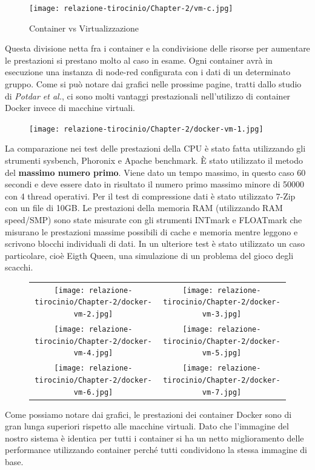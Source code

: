 \documentclass[a4paper,10pt]{memoir}
\begin{document}
\begin{figure}[ht]
\caption{Container vs Virtualizzazione}
\texttt{[image: relazione-tirocinio/Chapter-2/vm-c.jpg]}
\end{figure}
Questa divisione netta fra i container e la condivisione delle risorse per aumentare le prestazioni si prestano molto al caso in esame. Ogni container avrà in esecuzione una instanza di node-red configurata con i dati di un determinato gruppo.
Come si può notare dai grafici nelle prossime pagine, tratti dallo studio di \textit{Potdar et al.}\cite{dockervsvm}, ci sono molti vantaggi prestazionali nell'utilizzo di container Docker invece di macchine virtuali.

\begin{figure}
    \texttt{[image: relazione-tirocinio/Chapter-2/docker-vm-1.jpg]}
    \label{fig:docker-vm-1}
\end{figure}
La comparazione nei test delle prestazioni della CPU è stato fatta utilizzando gli strumenti sysbench, Phoronix e Apache benchmark. È stato utilizzato il metodo del \textbf{massimo numero primo}.
Viene dato un tempo massimo, in questo caso 60 secondi e deve essere dato in risultato il numero primo massimo minore di 50000 con 4 thread operativi.
Per il test di compressione dati è stato utilizzato 7-Zip con un file di 10GB.
Le prestazioni della memoria RAM (utilizzando RAM speed/SMP) sono state misurate con gli strumenti INTmark e FLOATmark che misurano le prestazioni massime possibili di cache e memoria mentre leggono e scrivono blocchi individuali di dati.
In un ulteriore test è stato utilizzato un caso particolare, cioè Eigth Queen, una simulazione di un problema del gioco degli scacchi.
\begin{figure}
\begin{tabular}{cc}
  \texttt{[image: relazione-tirocinio/Chapter-2/docker-vm-2.jpg]} &   \texttt{[image: relazione-tirocinio/Chapter-2/docker-vm-3.jpg]} \\
 \texttt{[image: relazione-tirocinio/Chapter-2/docker-vm-4.jpg]} &   \texttt{[image: relazione-tirocinio/Chapter-2/docker-vm-5.jpg]} \\
 \texttt{[image: relazione-tirocinio/Chapter-2/docker-vm-6.jpg]} &   \texttt{[image: relazione-tirocinio/Chapter-2/docker-vm-7.jpg]} \\
\end{tabular}
\end{figure}
Come possiamo notare dai grafici, le prestazioni dei container Docker sono di gran lunga superiori rispetto alle macchine virtuali. Dato che l'immagine del nostro sistema è identica per tutti i container si ha un netto miglioramento delle performance utilizzando container perché tutti condividono la stessa immagine di base.
\end{document}
